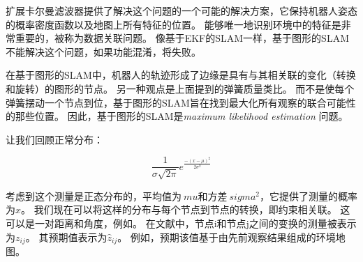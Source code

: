 扩展卡尔曼滤波器提供了解决这个问题的一个可能的解决方案，它保持机器人姿态的概率密度函数以及地图上所有特征的位置。 能够唯一地识别环境中的特征是非常重要的，被称为数据关联问题。 像基于EKF的SLAM一样，基于图形的SLAM不能解决这个问题，如果功能混淆，将失败。


在基于图形的SLAM中，机器人的轨迹形成了边缘是具有与其相关联的变化（转换和旋转）的图形的节点。 另一种观点是上面提到的弹簧质量类比。 而不是使每个弹簧摆动一个节点到位，基于图形的SLAM旨在找到最大化所有观察的联合可能性的那些位置。 因此，基于图形的SLAM是\emph {maximum likelihood estimation} 问题。


让我们回顾正常分布：

\begin{equation}
\frac{1}{\sigma\sqrt{2\pi}}e^{\frac{-(x-\mu)^2}{2\sigma^2}}
\end{equation}


考虑到这个测量是正态分布的，平均值为$ \ mu $和方差$ \ sigma ^ 2 $，它提供了测量的概率为$ x $。 我们现在可以将这样的分布与每个节点到节点的转换，即约束相关联。 这可以是一对距离和角度，例如。 在文献中，节点i和节点j之间的变换的测量被表示为$ z_{ij} $。 其预期值表示为$ \hat {z}_{ij} $。 例如，预期该值基于由先前观察结果组成的环境地图。


